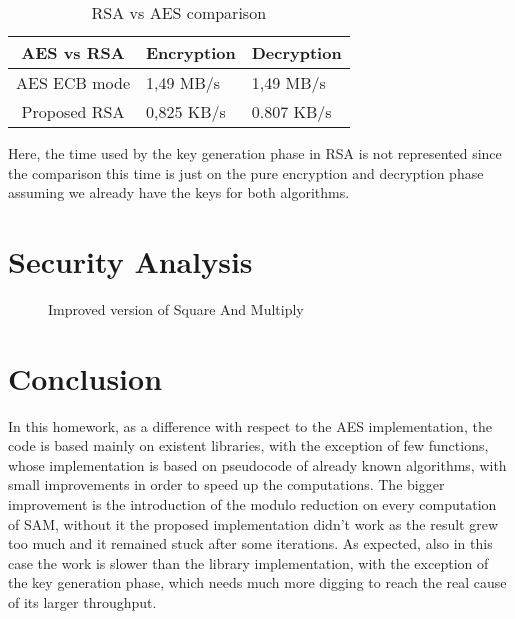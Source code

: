 \documentclass{article}
\begin{document}
\begin{table}[h]
	\begin{center}
		\begin{tabular}{ | c || m{2cm} | m{2cm} | }
			\hline
			AES vs RSA & Encryption & Decryption \\ [0.5ex] 
			\hline\hline
			AES ECB mode & 1,49 MB/s & 1,49 MB/s  \\ 
			\hline
			Proposed RSA & 0,825 KB/s & 0.807 KB/s \\ 
			\hline
		\end{tabular}
		\caption{RSA vs AES comparison}
		\label{tab:AES}
	\end{center}
\end{table}

Here, the time used by the key generation phase in RSA is not represented since the comparison this time is just on the pure encryption and decryption phase assuming we already have the keys for both algorithms.


\section{Security Analysis}
\label{sec:secAn}

\begin{figure}[H]
	\centering
	\caption{Improved version of Square And Multiply}
	\label{fig:sam}
\end{figure}


\section{Conclusion}

In this homework, as a difference with respect to the AES implementation, the code is based mainly on existent libraries, with the exception of few functions, whose implementation is based on pseudocode of already known algorithms, with small improvements in order to speed up the computations. The bigger improvement is the introduction of the modulo reduction on every computation of SAM, without it the proposed implementation didn't work as the result grew too much and it remained stuck after some iterations. As expected, also in this case the work is slower than the library implementation, with the exception of the key generation phase, which needs much more digging to reach the real cause of its larger throughput.
\end{document}
